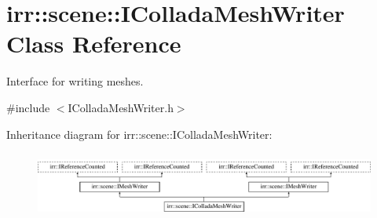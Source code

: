 \hypertarget{classirr_1_1scene_1_1IColladaMeshWriter}{}\section{irr\+:\+:scene\+:\+:I\+Collada\+Mesh\+Writer Class Reference}
\label{classirr_1_1scene_1_1IColladaMeshWriter}


Interface for writing meshes.  




{\ttfamily \#include $<$I\+Collada\+Mesh\+Writer.\+h$>$}

Inheritance diagram for irr\+:\+:scene\+:\+:I\+Collada\+Mesh\+Writer\+:\begin{figure}[H]
\begin{center}
\leavevmode
\includegraphics[height=2.210526cm]{classirr_1_1scene_1_1IColladaMeshWriter}
\end{center}
\end{figure}
